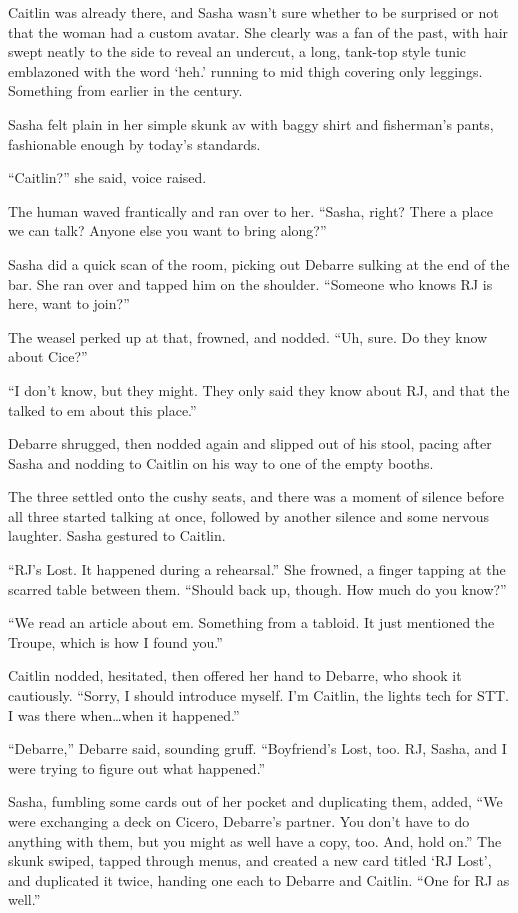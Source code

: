 Caitlin was already there, and Sasha wasn't sure whether to be surprised or not that the woman had a custom avatar. She clearly was a fan of the past, with hair swept neatly to the side to reveal an undercut, a long, tank-top style tunic emblazoned with the word `heh.' running to mid thigh covering only leggings. Something from earlier in the century.

Sasha felt plain in her simple skunk av with baggy shirt and fisherman's pants, fashionable enough by today's standards.

``Caitlin?'' she said, voice raised.

The human waved frantically and ran over to her. ``Sasha, right? There a place we can talk? Anyone else you want to bring along?''

Sasha did a quick scan of the room, picking out Debarre sulking at the end of the bar. She ran over and tapped him on the shoulder. ``Someone who knows RJ is here, want to join?''

The weasel perked up at that, frowned, and nodded. ``Uh, sure. Do they know about Cice?''

``I don't know, but they might. They only said they know about RJ, and that the talked to em about this place.''

Debarre shrugged, then nodded again and slipped out of his stool, pacing after Sasha and nodding to Caitlin on his way to one of the empty booths.

The three settled onto the cushy seats, and there was a moment of silence before all three started talking at once, followed by another silence and some nervous laughter. Sasha gestured to Caitlin.

``RJ's Lost. It happened during a rehearsal.'' She frowned, a finger tapping at the scarred table between them. ``Should back up, though. How much do you know?''

``We read an article about em. Something from a tabloid. It just mentioned the Troupe, which is how I found you.''

Caitlin nodded, hesitated, then offered her hand to Debarre, who shook it cautiously. ``Sorry, I should introduce myself. I'm Caitlin, the lights tech for STT. I was there when\ldots{}when it happened.''

``Debarre,'' Debarre said, sounding gruff. ``Boyfriend's Lost, too. RJ, Sasha, and I were trying to figure out what happened.''

Sasha, fumbling some cards out of her pocket and duplicating them, added, ``We were exchanging a deck on Cicero, Debarre's partner. You don't have to do anything with them, but you might as well have a copy, too. And, hold on.'' The skunk swiped, tapped through menus, and created a new card titled `RJ Lost', and duplicated it twice, handing one each to Debarre and Caitlin. ``One for RJ as well.''

